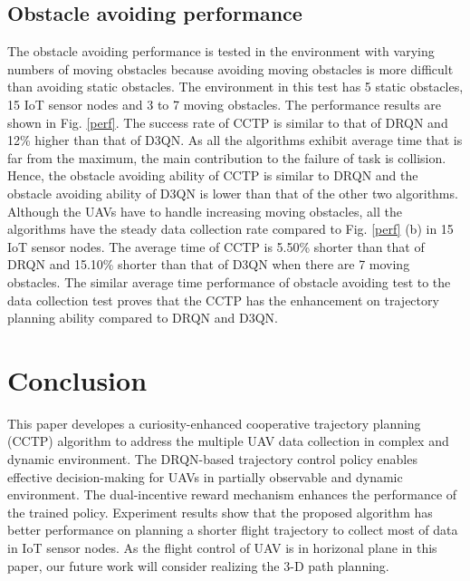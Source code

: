 \documentclass[conference]{IEEEtran}
\begin{document}
\subsection{Obstacle avoiding performance}
The obstacle avoiding performance is tested in the environment with varying numbers of moving obstacles because avoiding moving obstacles is more difficult than avoiding static obstacles. The environment in this test has 5 static obstacles, 15 IoT sensor nodes and 3 to 7 moving obstacles. The performance results are shown in Fig. \ref{perf}. The success rate of CCTP is similar to that of DRQN and 12\% higher than that of D3QN. As all the algorithms exhibit average time that is far from the maximum, the main contribution to the failure of task is collision. Hence, the obstacle avoiding ability of CCTP is similar to DRQN and the obstacle avoiding ability of D3QN is lower than that of the other two algorithms. Although the UAVs have to handle increasing moving obstacles, all the algorithms have the steady data collection rate compared to Fig. \ref{perf} (b) in 15 IoT sensor nodes. The average time of CCTP is 5.50\% shorter than that of DRQN and 15.10\% shorter than that of D3QN when there are 7 moving obstacles. The similar average time performance of obstacle avoiding test to the data collection test proves that the CCTP has the enhancement on trajectory planning ability compared to DRQN and D3QN. 

\section{Conclusion}\label{conclusion}
This paper developes a curiosity-enhanced cooperative trajectory planning (CCTP) algorithm to address the multiple UAV data collection in complex and dynamic environment. The DRQN-based trajectory control policy enables effective decision-making for UAVs in partially observable and dynamic environment. The dual-incentive reward mechanism enhances the performance of the trained policy. Experiment results show that the proposed algorithm has better performance on planning a shorter flight trajectory to collect most of data in IoT sensor nodes. As the flight control of UAV is in horizonal plane in this paper, our future work will consider realizing the 3-D path planning. 
\end{document}
